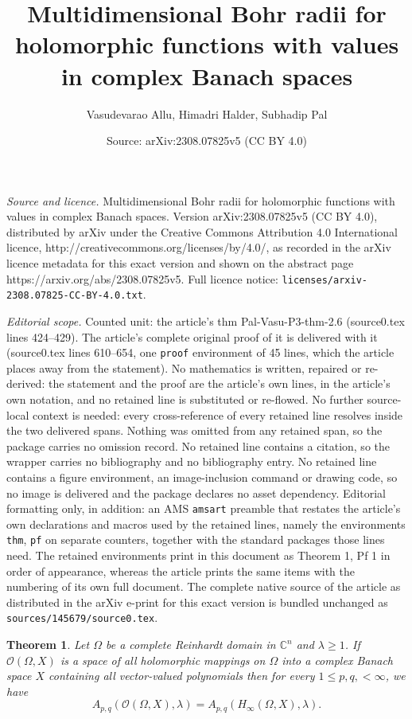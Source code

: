 \documentclass[10pt,a4paper]{amsart}
\title{Multidimensional Bohr radii for holomorphic functions with values in complex Banach spaces}
\author{Vasudevarao Allu, Himadri Halder, Subhadip Pal}
\date{Source: arXiv:2308.07825v5 (CC BY 4.0)}
\newtheorem{thm}{Theorem}
\begin{document}
\maketitle

\noindent\emph{Source and licence.} Multidimensional Bohr radii for holomorphic functions with values in complex Banach spaces. Version arXiv:2308.07825v5 (CC BY 4.0), distributed by arXiv under the Creative Commons Attribution 4.0 International licence, http://creativecommons.org/licenses/by/4.0/, as recorded in the arXiv licence metadata for this exact version and shown on the abstract page https://arxiv.org/abs/2308.07825v5. Full licence notice: \texttt{licenses/arxiv-2308.07825-CC-BY-4.0.txt}.\par\smallskip

\noindent\textit{Editorial scope.} Counted unit: the article's thm Pal-Vasu-P3-thm-2.6 (source0.tex lines 424--429). The article's complete original proof of it is delivered with it (source0.tex lines 610--654, one \texttt{proof} environment of 45 lines, which the article places away from the statement). No mathematics is written, repaired or re-derived: the statement and the proof are the article's own lines, in the article's own notation, and no retained line is substituted or re-flowed.  No further source-local context is needed: every cross-reference of every retained line resolves inside the two delivered spans.  Nothing was omitted from any retained span, so the package carries no omission record.  No retained line contains a citation, so the wrapper carries no bibliography and no bibliography entry.  No retained line contains a figure environment, an image-inclusion command or drawing code, so no image is delivered and the package declares no asset dependency.  Editorial formatting only, in addition: an AMS \texttt{amsart} preamble that restates the article's own declarations and macros used by the retained lines, namely the environments \texttt{thm}, \texttt{pf} on separate counters, together with the standard packages those lines need.  The retained environments print in this document as Theorem 1, Pf 1 in order of appearance, whereas the article prints the same items with the numbering of its own full document.  The complete native source of the article as distributed in the arXiv e-print for this exact version is bundled unchanged as \texttt{sources/145679/source0.tex}.
\begin{thm}\label{Pal-Vasu-P3-thm-2.6}
	Let $\Omega$ be a complete Reinhardt domain in $\mathbb{C}^n$ and $\lambda\geq 1$. If $\mathcal{O}(\Omega, X)$ is a space of all holomorphic mappings on $\Omega$ into a complex Banach space $X$ containing all vector-valued polynomials then for every $1\leq p,q, <\infty$, we have
	\begin{equation*}
		A_{p,q}(\mathcal{O}(\Omega, X), \lambda)=A_{p,q}(H_{\infty}(\Omega, X), \lambda).
	\end{equation*}
\end{thm}
\end{document}
